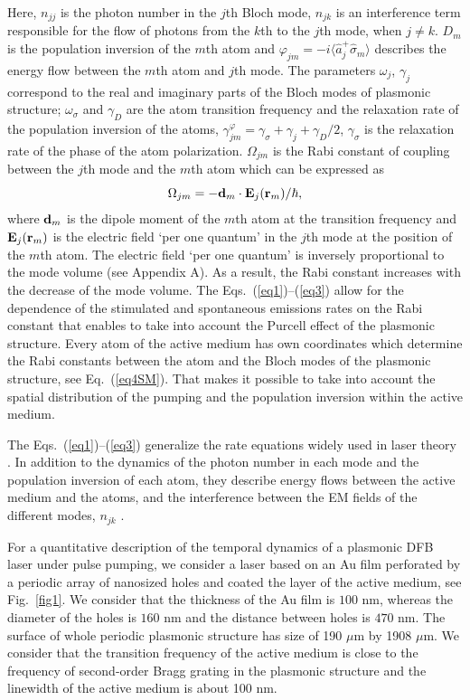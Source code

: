 \documentclass[aps,pra,amsmath,amssymb,onecolumn,superscriptaddress,showpacs,floatfix,]{revtex4-1}
\begin{document}
Here, $n_{jj}$ is the photon number in the $j$th Bloch mode, $n_{jk}$ is an interference term responsible for the flow of photons from the $k$th to the $j$th mode, when $j \neq k$.
$D_m$ is the population inversion of the $m$th atom and $\varphi _{jm} = - i \langle \hat{a} _j^{+} \hat{\sigma} _m \rangle$ describes the energy flow between the $m$th atom and $j$th mode.
The parameters $\omega _j$, $\gamma _j$ correspond to the real and imaginary parts of the Bloch modes of plasmonic structure; $\omega _{\sigma}$ and $\gamma _D$ are the atom transition frequency and the relaxation rate of the population inversion of the atoms, $\gamma _{jm}^{\varphi} = \gamma _{\sigma} + \gamma _j + \gamma _D / 2$, $\gamma _{\sigma}$ is the relaxation rate of the phase of the atom polarization.
$\Omega _{jm}$ is the Rabi constant of coupling between the $j$th mode and the $m$th atom which can be expressed as
\begin{equation}\label{eq4SM}
{\Omega _{jm}} =  - {{\bf{d}}_m} \cdot {{\bf{E}}_j}({{\bf{r}}_m})/ \hbar,
\end{equation}
where ${{\bf{d}}_m}$  is the dipole moment of the $m$th atom at the transition frequency and ${{\bf{E}}_j}({{\bf{r}}_m})$  is the electric field `per one quantum' in the $j$th mode at the position of the $m$th atom. The electric field `per one quantum' is inversely proportional to the mode volume (see Appendix A). As a result, the Rabi constant increases with the decrease of the mode volume. The Eqs.~(\ref{eq1})--(\ref{eq3}) allow for the dependence of the stimulated and spontaneous emissions rates on the Rabi constant that enables to take into account the Purcell effect of the plasmonic structure. Every atom of the active medium has own coordinates which determine the Rabi constants between the atom and the Bloch modes of the plasmonic structure, see Eq.~(\ref{eq4SM}). That makes it possible to take into account the spatial distribution of the pumping and the population inversion within the active medium. 

The Eqs.~(\ref{eq1})--(\ref{eq3}) generalize the rate equations widely used in laser theory \cite{SiegmanLasers}.
In addition to the dynamics of the photon number in each mode and the population inversion of each atom, they describe energy flows between the active medium and the atoms, and the interference between the EM fields of the different modes, $n_{jk}$ \cite{Zyablovsky2017approach}. 

For a quantitative description of the temporal dynamics of a plasmonic DFB laser under pulse pumping, we consider a laser based on an Au film perforated by a periodic array of nanosized holes and coated the layer of the active medium, see Fig.~\ref{fig1}. We consider that the thickness of the Au film is $100$ $\text{nm}$, whereas the diameter of the holes is $160$ $\text{nm}$ and the distance between holes is $470$ $\text{nm}$. The surface of whole periodic plasmonic structure has size of 190 $\mu$m by 1908 $\mu$m. We consider that the transition frequency of the active medium is close to the frequency of second-order Bragg grating in the plasmonic structure and the linewidth of the active medium is about 100 nm.
\end{document}
